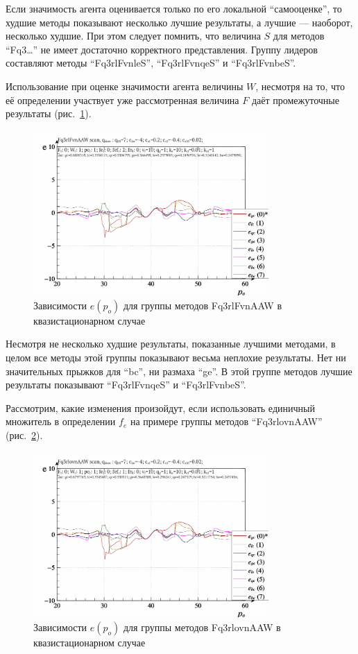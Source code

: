 Если значимость агента оценивается только по его локальной
``самооценке'', то худшие методы показывают несколько
лучшие результаты, а лучшие --- наоборот, несколько
худшие.
При этом следует помнить, что величина $S$
для методов ``Fq3\ldots'' не имеет достаточно корректного представления.
Группу лидеров составляют методы
``Fq3rlFvnleS'', ``Fq3rlFvnqeS'' и ``Fq3rlFvnbeS''.

Использование при оценке значимости агента величины $W$,
несмотря на то, что её определении участвует уже рассмотренная величина $F$
даёт промежуточные результаты (рис.~\ref{atu:f:Fq3rlFvnAAW_scan}).

\begin{figure}[htb!]
  \centerline{
    \includegraphics[width=0.8\textwidth]{p/scan/qls-p_p_e_Fq3rlFvnAAW_scan.png}
  }
  \caption{Зависимости $e(p_o)$ для группы методов Fq3rlFvnAAW в квазистационарном случае}
  \label{atu:f:Fq3rlFvnAAW_scan}
\end{figure}

Несмотря не несколько худшие результаты, показанные лучшими
методами, в целом все методы этой группы показывают
весьма неплохие результаты. Нет ни значительных прыжков для ``bc'',
ни размаха ``ge''.
В этой группе методов лучшие результаты показывают
``Fq3rlFvnqeS'' и ``Fq3rlFvnbeS''.


Рассмотрим, какие изменения произойдут, если использовать
единичный множитель в определении $f_e$ на примере группы методов ``Fq3rlovnAAW''
(рис.~\ref{atu:f:Fq3rlovnAAW_scan}).

\begin{figure}[htb!]
  \centerline{
    \includegraphics[width=0.8\textwidth]{p/scan/qls-p_p_e_Fq3rlovnAAW_scan.png}
  }
  \caption{Зависимости $e(p_o)$ для группы методов Fq3rlovnAAW в квазистационарном случае}
  \label{atu:f:Fq3rlovnAAW_scan}
\end{figure}

